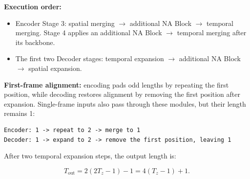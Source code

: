 \documentclass[
  11pt,
  a4paper,
]{article}
\providecommand{\tightlist}{%
  \setlength{\itemsep}{0pt}\setlength{\parskip}{0pt}}
\begin{document}
\endgroup

\textbf{Execution order:}

\begin{itemize}
\tightlist
\item
  Encoder Stage 3: spatial merging \(\rightarrow\) additional NA Block
  \(\rightarrow\) temporal merging. Stage 4 applies an additional NA
  Block \(\rightarrow\) temporal merging after its backbone.
\item
  The first two Decoder stages: temporal expansion \(\rightarrow\)
  additional NA Block \(\rightarrow\) spatial expansion.
\end{itemize}

\textbf{First-frame alignment:} encoding pads odd lengths by repeating
the first position, while decoding restores alignment by removing the
first position after expansion. Single-frame inputs also pass through
these modules, but their length remains 1:

\begin{verbatim}
Encoder: 1 -> repeat to 2 -> merge to 1
Decoder: 1 -> expand to 2 -> remove the first position, leaving 1
\end{verbatim}

After two temporal expansion steps, the output length is:

\[
T_{\mathrm{out}}=2(2T_z-1)-1=4(T_z-1)+1.
\]
\end{document}

